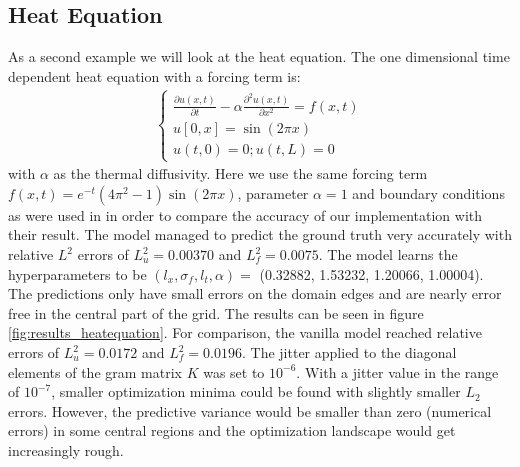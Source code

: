 \documentclass{article}
\begin{document}
\subsection{Heat Equation}
As a second example we will look at the heat equation.
The one dimensional time dependent heat equation with a forcing term is:
\begin{equation}
    \begin{aligned}
        {\displaystyle {\begin{cases} 
         \frac{\partial u(x,t)}{\partial t} - \alpha \frac{\partial^2 u(x,t)}{\partial x^2} = f(x,t) 
        \\ u[0,x] = \sin{(2\pi x)}
        \\ u(t,0) = 0; u(t,L) = 0
        \end{cases}}}
    \end{aligned}
\end{equation}
with $\alpha$ as the thermal diffusivity. Here we use the same forcing term $f(x,t) = e^{-t}(4\pi^2-1)\sin{(2\pi x)}$, parameter $\alpha = 1$ and boundary conditions as were used in \cite{RAISSI} in order to compare the accuracy of our implementation with their result. The model managed to predict the ground truth very accurately with relative $L^2$ errors of $L^2_u = 0.00370 $ and $L^2_f = 0.0075$. The model learns the hyperparameters to be $(l_x, \sigma_f, l_t, \alpha) =$ (0.32882, 1.53232, 1.20066, 1.00004). The predictions only have small errors on the domain edges and are nearly error free in the central part of the grid. The results can be seen in figure \ref{fig:results_heatequation}. For comparison, the vanilla model reached relative errors of $L^2_u = 0.0172$ and $L^2_f = 0.0196$. 
The jitter applied to the diagonal elements of the gram matrix $K$ was set to $10^{-6}$. With a jitter value in the range of $10^{-7}$, smaller optimization minima could be found with slightly smaller $L_2$ errors. However, the predictive variance would be smaller than zero (numerical errors) in some central regions and the optimization landscape would get increasingly rough.
\end{document}
